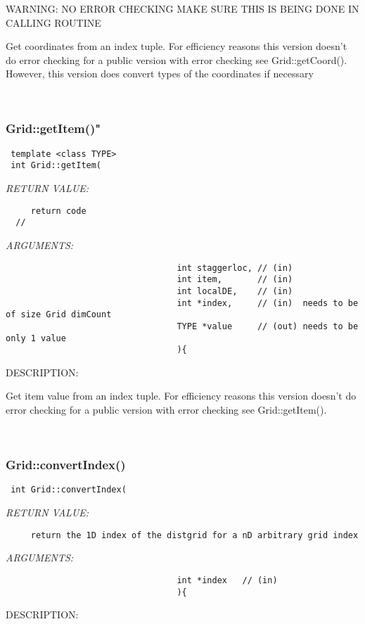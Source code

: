   
    WARNING: NO ERROR CHECKING MAKE SURE THIS IS BEING DONE IN CALLING ROUTINE
  
    Get coordinates from an index tuple. For efficiency reasons this version doesn't do error checking
    for a public version with error checking see  Grid::getCoord(). However, this version does convert
    types of the coordinates if necessary
  
   
 
\mbox{}\hrulefill\
 
\subsubsection [Grid::getItem()"] {Grid::getItem()"}


  
\begin{verbatim} template <class TYPE>
 int Grid::getItem(\end{verbatim}{\em RETURN VALUE:}
\begin{verbatim}     return code
  //   \end{verbatim}{\em ARGUMENTS:}
\begin{verbatim}                                  int staggerloc, // (in)
                                  int item,       // (in)
                                  int localDE,    // (in)
                                  int *index,     // (in)  needs to be of size Grid dimCount
                                  TYPE *value     // (out) needs to be only 1 value
                                  ){\end{verbatim}
{\sf DESCRIPTION:\\ }


    Get item value from an index tuple. For efficiency reasons this version doesn't do error checking
    for a public version with error checking see  Grid::getItem().  
  
   
 
\mbox{}\hrulefill\
 
\subsubsection [Grid::convertIndex()] {Grid::convertIndex()}


  
\begin{verbatim} int Grid::convertIndex(\end{verbatim}{\em RETURN VALUE:}
\begin{verbatim}     return the 1D index of the distgrid for a nD arbitrary grid index
     \end{verbatim}{\em ARGUMENTS:}
\begin{verbatim}                                  int *index   // (in)
                                  ){\end{verbatim}
{\sf DESCRIPTION:\\ }


